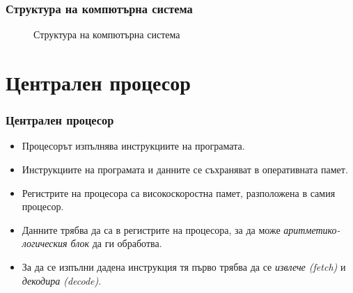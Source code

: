\documentclass[ignorenonframetext, hyperref=unicode]{beamer}
\begin{document}
\begin{frame}
\frametitle{Структура на компютърна система}
\begin{figure}[h]
\center
{}
\caption{Структура на компютърна система}
\end{figure}
\end{frame}


\section{Централен процесор}

\begin{frame}
\frametitle{Централен процесор}
\begin{itemize}
\item Процесорът изпълнява инструкциите на програмата.
\item Инструкциите на програмата и данните се съхраняват в оперативната памет.
\item Регистрите на процесора са високоскоростна памет, разположена в самия
процесор. 
\item Данните трябва да са в регистрите на процесора, за да може
{\em аритметико-логическия блок} да ги обработва. 
\item За да се изпълни дадена инструкция тя първо трябва да се {\em извлече (fetch)} и
{\em декодира (decode)}.
\end{itemize}
\end{frame}
\end{document}

